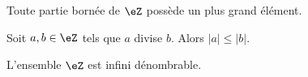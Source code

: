 \begin{lemma}       \label{LEMooMYEIooNFwNVI}
    Toute partie bornée de \( \eZ\) possède un plus grand élément.
\end{lemma}

\begin{proposition}     \label{PROPooYJBMooZrzkNX}
    Soit \( a,b\in \eZ\) tels que \( a\) divise \( b\). Alors \( | a |\leq | b |\).
\end{proposition}

\begin{lemma}       \label{LEMooJNXIooBmdOVi}
    L'ensemble \( \eZ\) est infini dénombrable.
\end{lemma}
